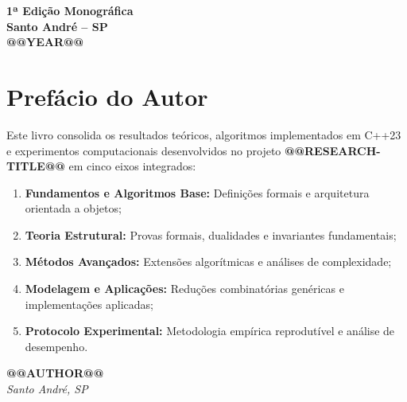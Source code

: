 \begin{titlepage}
    \vfill

    {\fontsize{9.5}{13}\selectfont\color{darkslate!80}\textbf{1ª Edição Monográfica}}\\[0.2cm]
    {\fontsize{10.5}{14}\selectfont\textbf{Santo André -- SP}}\\[0.15cm]
    {\fontsize{10.5}{14}\selectfont\textbf{@@YEAR@@}}
\end{titlepage}
\hypersetup{pageanchor=true}

\chapter*{Prefácio do Autor}

Este livro consolida os resultados teóricos, algoritmos implementados em C++23 e experimentos computacionais desenvolvidos no projeto \textbf{@@RESEARCH-TITLE@@} em cinco eixos integrados:
\begin{enumerate}[leftmargin=1.5em, itemsep=0.4em]
    \item \textbf{Fundamentos e Algoritmos Base:} Definições formais e arquitetura orientada a objetos;
    \item \textbf{Teoria Estrutural:} Provas formais, dualidades e invariantes fundamentais;
    \item \textbf{Métodos Avançados:} Extensões algorítmicas e análises de complexidade;
    \item \textbf{Modelagem e Aplicações:} Reduções combinatórias genéricas e implementações aplicadas;
    \item \textbf{Protocolo Experimental:} Metodologia empírica reprodutível e análise de desempenho.
\end{enumerate}

\vspace{1cm}
\begin{flushright}
    \textbf{@@AUTHOR@@}\\
    \textit{Santo André, SP}
\end{flushright}

\newpage
\tableofcontents
\newpage
